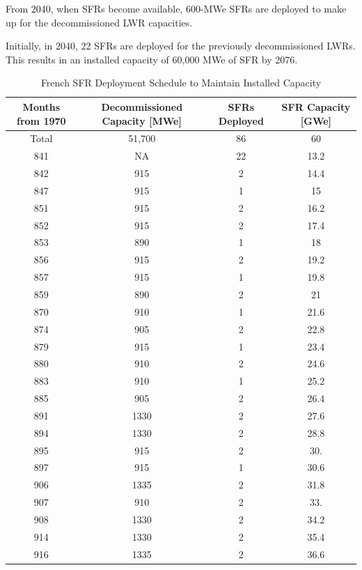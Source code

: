 From 2040, when \gls{SFR}s become available,
600-MWe \gls{SFR}s are deployed to make up for the 
decommissioned \gls{LWR} capacities.

Initially, in 2040, 22 \gls{SFR}s
are deployed for the previously decommissioned
\gls{LWR}s. This results in an installed capacity of 60,000 MWe
of \gls{SFR} by 2076.

\begin{table}[h]
	\centering
	\label{tab:sfr_deploy}
	\caption{French SFR Deployment Schedule to Maintain Installed Capacity}
	\begin{tabular}{|c|c|c|c|}	
		\hline
		Months from 1970 & Decommissioned Capacity [MWe] & \gls{SFR}s Deployed & \gls{SFR} Capacity [GWe] \\ \hline
		Total & 51,700 & 86 &  60\\ \hline
		841 & NA & 22 & 13.2 \\ \hline
		842 & 915 & 2 & 14.4 \\ \hline
		847 & 915 & 1 & 15 \\ \hline
		851 & 915 & 2 & 16.2 \\ \hline
		852 & 915 & 2 & 17.4 \\ \hline
		853 & 890 & 1 & 18 \\ \hline
		856 & 915 & 2 & 19.2 \\ \hline
		857 & 915 & 1 & 19.8 \\ \hline
		859 & 890 & 2 & 21 \\ \hline
		870 & 910 & 1 & 21.6 \\ \hline
		874 & 905 & 2 & 22.8 \\ \hline
		879 & 915 & 1 & 23.4 \\ \hline
		880 & 910 & 2 & 24.6 \\ \hline
		883 & 910 & 1 & 25.2 \\ \hline
		885 & 905 & 2 & 26.4 \\ \hline
		891 & 1330 & 2 & 27.6  \\ \hline
		894 & 1330 & 2 & 28.8 \\ \hline
		895 & 915 & 2 & 30. \\ \hline
		897 & 915 & 1 & 30.6 \\ \hline
		906 & 1335 & 2 & 31.8 \\ \hline
		907 & 910 & 2 & 33. \\ \hline
		908 & 1330 & 2 & 34.2 \\ \hline
		914 & 1330 & 2 & 35.4 \\ \hline
		916 & 1335 & 2 & 36.6 \\ \hline

\end{tabular}
\end{table}
